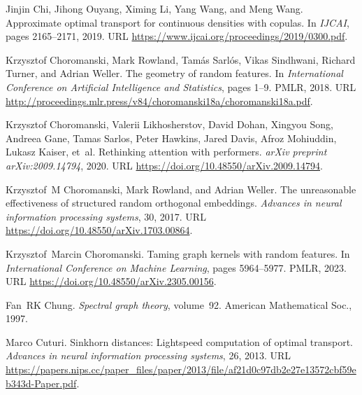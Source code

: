 \begin{thebibliography}{76}
Jinjin Chi, Jihong Ouyang, Ximing Li, Yang Wang, and Meng Wang.
\newblock Approximate optimal transport for continuous densities with copulas.
\newblock In \emph{IJCAI}, pages 2165--2171, 2019.
\newblock URL \url{https://www.ijcai.org/proceedings/2019/0300.pdf}.

Krzysztof Choromanski, Mark Rowland, Tam{\'a}s Sarl{\'o}s, Vikas Sindhwani, Richard Turner, and Adrian Weller.
\newblock The geometry of random features.
\newblock In \emph{International Conference on Artificial Intelligence and Statistics}, pages 1--9. PMLR, 2018.
\newblock URL \url{http://proceedings.mlr.press/v84/choromanski18a/choromanski18a.pdf}.

Krzysztof Choromanski, Valerii Likhosherstov, David Dohan, Xingyou Song, Andreea Gane, Tamas Sarlos, Peter Hawkins, Jared Davis, Afroz Mohiuddin, Lukasz Kaiser, et~al.
\newblock Rethinking attention with performers.
\newblock \emph{arXiv preprint arXiv:2009.14794}, 2020.
\newblock URL \url{https://doi.org/10.48550/arXiv.2009.14794}.

Krzysztof~M Choromanski, Mark Rowland, and Adrian Weller.
\newblock The unreasonable effectiveness of structured random orthogonal embeddings.
\newblock \emph{Advances in neural information processing systems}, 30, 2017.
\newblock URL \url{https://doi.org/10.48550/arXiv.1703.00864}.

Krzysztof~Marcin Choromanski.
\newblock Taming graph kernels with random features.
\newblock In \emph{International Conference on Machine Learning}, pages 5964--5977. PMLR, 2023.
\newblock URL \url{https://doi.org/10.48550/arXiv.2305.00156}.

Fan~RK Chung.
\newblock \emph{Spectral graph theory}, volume~92.
\newblock American Mathematical Soc., 1997.

Marco Cuturi.
\newblock Sinkhorn distances: Lightspeed computation of optimal transport.
\newblock \emph{Advances in neural information processing systems}, 26, 2013.
\newblock URL \url{https://papers.nips.cc/paper_files/paper/2013/file/af21d0c97db2e27e13572cbf59eb343d-Paper.pdf}.


\end{thebibliography}
